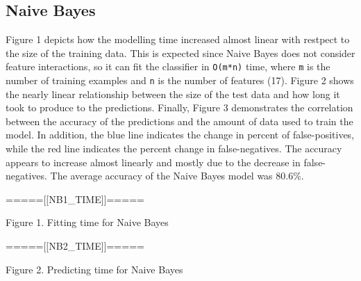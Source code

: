 \documentclass[a4paper]{article}
\begin{document}
\begin{multicols}{2}
\subsection*{Naive Bayes}
Figure 1 depicts how the modelling time increased almost linear with restpect to the size of the training data. This is expected since Naive Bayes does not consider feature interactions, so it can fit the classifier in \texttt{O(m*n)} time, where \texttt{m} is the number of training examples and \texttt{n} is the number of features (17). Figure 2 shows the nearly linear relationship between the size of the test data and how long it took to produce to the predictions. Finally, Figure 3 demonstrates the correlation between the accuracy of the predictions and the amount of data used to train the model. In addition, the blue line indicates the change in percent of false-positives, while the red line indicates the percent change in false-negatives. The accuracy appears to increase almost linearly and mostly due to the decrease in false-negatives. The average accuracy of the Naive Bayes model was 80.6\%. 
\begin{Schunk}
\end{Schunk}
\begin{center}
=====[[NB1\_TIME]]=====

Figure 1. Fitting time for Naive Bayes
\end{center}

\begin{Schunk}
\end{Schunk}
\begin{center}
=====[[NB2\_TIME]]=====

Figure 2. Predicting time for Naive Bayes
\end{center}


\end{multicols}
\end{document}
